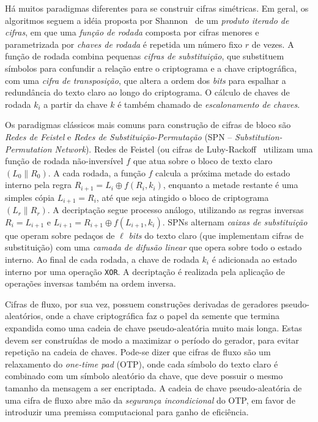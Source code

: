 Há muitos paradigmas diferentes para se construir cifras simétricas. Em geral, os algoritmos seguem a idéia proposta por Shannon~\cite{Shannon49} de um \emph{produto iterado de cifras}, em que uma \emph{função de rodada} composta por cifras menores e parametrizada por \emph{chaves de rodada} é repetida um número fixo $r$ de vezes. A função de rodada combina pequenas \emph{cifras de substituição}, que substituem símbolos para confundir a relação entre o criptograma e a chave criptográfica, com uma \emph{cifra de transposição}, que altera a ordem dos \emph{bits} para espalhar a redundância do texto claro ao longo do criptograma. O cálculo de chaves de rodada $k_i$ a partir da chave $k$ é também chamado de \emph{escalonamento de chaves}.

Os paradigmas clássicos mais comuns para construção de cifras de bloco são \emph{Redes de Feistel} e \emph{Redes de Substituição-Permutação} (SPN -- \emph{Substitution-Permutation Network}). Redes de Feistel (ou cifras de Luby-Rackoff~\cite{LubyR88} utilizam uma função de rodada não-inversível $f$ que atua sobre o bloco de texto claro $(L_0 \parallel R_0)$. A cada rodada, a função $f$ calcula a próxima metade do estado interno pela regra $R_{i+1} = L_i \oplus f(R_i, k_i)$, enquanto a metade restante é uma simples cópia $L_{i+1} = R_i$, até que seja atingido o bloco de criptograma $(L_r \parallel R_r)$. A decriptação segue processo análogo, utilizando as regras inversas $R_{i} = L_{i+1}$ e $L_{i+1} = R_{i+1} \oplus f(L_{i+1}, k_i)$. SPNs alternam \emph{caixas de substituição} que operam sobre pedaços de $\ell$ \emph{bits} do texto claro (que implementam cifras de substituição) com uma \emph{camada de difusão linear} que opera sobre todo o estado interno. Ao final de cada rodada, a chave de rodada $k_i$ é adicionada ao estado interno por uma operação \texttt{XOR}. A decriptação é realizada pela aplicação de operações inversas também na ordem inversa.

Cifras de fluxo, por sua vez, possuem construções derivadas de geradores pseudo-aleatórios, onde a chave criptográfica faz o papel da semente que termina expandida como uma cadeia de chave pseudo-aleatória muito mais longa. Estas devem ser construídas de modo a maximizar o período do gerador, para evitar repetição na cadeia de chaves. Pode-se dizer que cifras de fluxo são um relaxamento do \emph{one-time pad} (OTP), onde cada símbolo do texto claro é combinado com um símbolo aleatório da chave, que deve possuir o mesmo tamanho da mensagem a ser encriptada. A cadeia de chave pseudo-aleatória de uma cifra de fluxo abre mão da \emph{segurança incondicional} do OTP, em favor de introduzir uma premissa computacional para ganho de eficiência.

